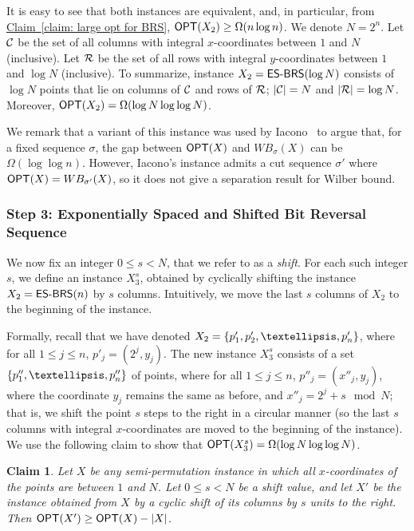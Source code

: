 \documentclass[11pt]{article}
\numberwithin{equation}{section}
\newtheorem{claim}[theorem]{Claim}
\theoremstyle{definition}
\theoremstyle{plain}
\newcommand{\expref}[2]{\hyperref[#2]{#1~\ref{#2}}}
\begin{document}
It is easy to see that both instances are equivalent, and, in particular, from \expref{Claim}{claim: large opt for BRS}, $\mbox{\sf OPT}(X_2)\geq \Omega(n\log n)$.
We denote $N=2^n$. Let ${\mathcal C}$ be the set of all columns with integral $x$-coordinates between $1$ and $N$ (inclusive). Let ${\mathcal R}$ be the set of all rows with integral $y$-coordinates between $1$ and $\log N$ (inclusive).
 To summarize, instance $X_2=\mbox{\sf{ES-BRS}}(\log N)$ consists of $\log N$ points that lie on columns of ${\mathcal C}$ and rows of ${\mathcal R}$; $|{\mathcal C}|= N$ and $|{\mathcal R}|=\log N$. Moreover, $\mbox{\sf OPT}(X_2)=\Omega(\log N\log\log N)$.


We remark that a variant of this instance was used by Iacono~\cite{in_pursuit} to argue that, for a fixed sequence $\sigma$, the gap between $\mbox{\sf OPT}(X)$ and $WB_{\sigma}(X)$ can be $\Omega(\log \log n)$. 
However, Iacono's instance admits a cut sequence $\sigma'$ where $\mbox{\sf OPT}(X) = WB_{\sigma'}(X)$, so it does not give a separation result for Wilber bound.    


%
%
%
\subsubsection{Step 3: Exponentially Spaced and Shifted Bit Reversal Sequence}
%
%
%
%
We now fix an integer $0\leq s< N$, that we refer to as a \emph{shift}. For each such integer $s$, we define an instance $X^s_3$, obtained by cyclically shifting the instance $X_2=\mbox{\sf{ES-BRS}}(n)$ by $s$ columns. Intuitively, we move the last $s$ columns of $X_2$ to the beginning of the instance. 

Formally, recall that we have denoted $X_2=\set{p'_1,p'_2,\ldots,p'_{n}}$, where for all $1\leq j\leq n$, 
$p'_j=(2^j,y_j)$. The new instance $X_3^s$ consists of a set $\set{p''_1,\ldots,p''_n}$ of points, where for  all $1\leq j\leq n$, $p''_j=(x''_j,y_j)$, where the coordinate $y_j$ remains the same as before, and $x''_j=2^j+s\mod N$; that is, we shift the point $s$ steps to the right in a circular manner (so the last $s$ columns with integral $x$-coordinates are moved to the beginning of the instance). 
We use the following claim to show that $\mbox{\sf OPT}(X_3^s)=\Omega(\log N\log\log N)$.

\begin{claim}\label{claim: shifting does not hurt opt}
	Let $X$ be any semi-permutation instance in which all $x$-coordinates of the points are between $1$ and $N$. Let $0\leq s<N$ be a shift value, and let $X'$ be the instance obtained from $X$ by a cyclic shift of its columns by $s$ units to the right.  
Then $\mbox{\sf OPT}(X')\geq \mbox{\sf OPT}(X)-|X|$.
\end{claim}
\end{document}
